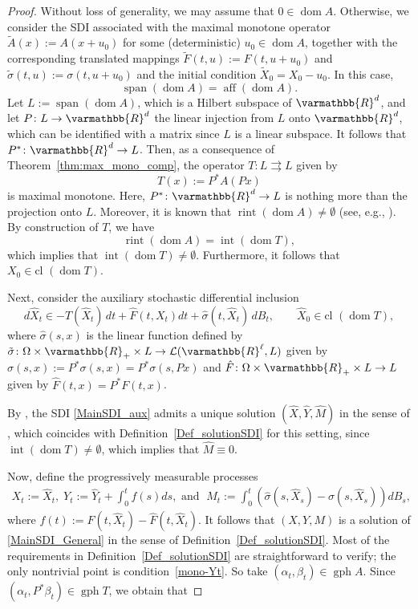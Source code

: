\documentclass[11pt,reqno]{article}
\let\mathbb=\varmathbb
\newcommand{\R}{\mathbb{R}}
\newcommand{\tto}{\rightrightarrows}
\newcommand{\gph}{\operatorname{gph}}
\newcommand{\dom}{\operatorname{dom}}
\newcommand{\cl}{{\text{cl }}}
\newcommand{\1}{\mathds{1}}
\DeclareMathOperator{\aff}{aff}
\numberwithin{equation}{section}  %
\theoremstyle{plain}
\theoremstyle{definition}
\theoremstyle{remark}
\numberwithin{theorem}{section}
\numberwithin{remark}{section}
\numberwithin{example}{section}
\begin{document}
\begin{proof}
Without loss of generality, we may assume that $0 \in \dom A$. Otherwise, we consider the SDI associated with the maximal monotone operator
$\tilde{A}(x) := A(x + u_0)$ for some (deterministic) $u_0 \in \dom A$, together
with the corresponding translated mappings
$\tilde{F}(t,u) := F(t,u + u_0)$ and
$\tilde{\sigma}(t,u) := \sigma(t, u + u_0)$ and the initial condition $\tilde{X}_0 = X_0 - u_0$.
In this case, 
\[
    \operatorname{span}(\dom A) = \aff(\dom A).
\] 
Let $L := \operatorname{span}(\dom A)$, which is a Hilbert subspace of $\R^d$,  and let $P\colon  L \to \R^d$  the linear injection  from $L$ onto $\R^d$, which can be identified with a matrix since $L$ is a linear subspace.   It follows that $P^\ast \colon \R^d \to L$. Then, as a consequence of Theorem~\ref{thm:max_mono_comp}, the operator $T\colon  L \tto L$ given by
\[
    T(x) := P^\ast A(Px)
\]
is maximal monotone. Here, $P^\ast \colon \mathbb{R}^d \to L$ is nothing more than the projection onto $L$. Moreover, it is known that $\operatorname{rint}(\dom A) \neq \emptyset$ (see, e.g., \cite[Theorem~12.41]{MR1491362}).   By construction of $T$, we have
\[
    \operatorname{rint}(\dom A) = \operatorname{int}(\dom T),
\]
which implies that $\operatorname{int}(\dom T) \neq \emptyset$. Furthermore, it follows that $X_0 \in \cl(\dom T)$. 

Next, consider the auxiliary stochastic differential inclusion
\begin{equation}\label{MainSDI_aux}
    d\hat{X}_t \in -T(\hat{X}_t)\,dt + \hat{F}(t,X_t)dt +  \hat{\sigma}(t,\hat{X}_t)\,dB_t, 
    \qquad \hat{X}_0 \in \cl(\dom T),
\end{equation}
where $\hat{\sigma} (s,x) $ is the linear function defined by $\tilde{\sigma} \colon \Omega\times \R_+ \times L \to \mathcal{L} (\R^\ell, L)$ given by $\hat{\sigma} (s, x):= P^\ast\sigma(s,x) = P^\ast\sigma(s,Px) $ and $\hat{F} \colon \Omega\times \R_+ \times L \to L $ given by   $\hat{F}(t,x) =P^\ast F(t,x)$.

By \cite[Theorem~4.19]{MR3308895}, the SDI \eqref{MainSDI_aux} admits a unique solution $(\hat{X}, \hat{Y}, \hat{M})$ in the sense of \cite[Definition 4.2]{MR3308895}, which coincides with   Definition~\ref{Def_solutionSDI} for this setting, since   $\operatorname{int}(\dom T) \neq \emptyset$, which implies  that $\hat{M} \equiv 0$.  

Now, define the progressively measurable processes
\begin{align*}
   X_t   := \hat{X}_t,\; 
     Y_t := \hat{Y}_t+ \int_0^t f(s) ds, \text{ and }
    \; M_t  := \int_0^t \left( \hat{\sigma}(s,\hat{X}_s) -   \sigma(s,\hat{X}_s)\right) dB_s,
\end{align*}
 where $f(t):=    {F}(t,\hat{X}_t) -  \hat{F}(t,\hat{X}_t)$.
It follows that $(X,Y,M)$ is a solution of \eqref{MainSDI_General} in the sense of Definition~\ref{Def_solutionSDI}. Most of the requirements in Definition~\ref{Def_solutionSDI} are straightforward to verify; the only nontrivial point is condition~\eqref{mono-Yt}. So take $(\alpha_t,\beta_t)\in \gph A$. Since $(\alpha_t, P^\ast \beta_t)\in \gph T$, we obtain that


\end{proof}
\end{document}
